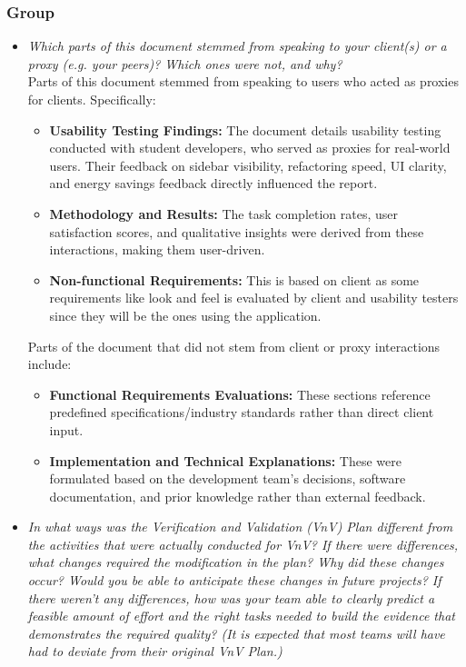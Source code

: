 \documentclass[12pt, titlepage]{article}
\begin{document}
\subsubsection*{Group}
\begin{itemize}
  \item \textit{Which parts of this document stemmed from speaking to
      your client(s) or
    a proxy (e.g. your peers)? Which ones were not, and why?} \\

    Parts of this document stemmed from speaking to users who acted
    as proxies for clients. Specifically:
    \begin{itemize}
      \item \textbf{Usability Testing Findings:} The document details
        usability testing conducted with student developers, who
        served as proxies for real-world users. Their feedback on
        sidebar visibility, refactoring speed, UI clarity, and energy
        savings feedback directly influenced the report.
      \item \textbf{Methodology and Results:} The task completion
        rates, user satisfaction scores, and qualitative insights
        were derived from these interactions, making them user-driven.
      \item \textbf{Non-functional Requirements:} This is based on
        client as some requirements like look and feel is evaluated
        by client and usability testers since they will be the ones
        using the application.
    \end{itemize}

    Parts of the document that did not stem from client or proxy
    interactions include:
    \begin{itemize}

      \item \textbf{Functional Requirements Evaluations:} These
        sections reference predefined specifications/industry
        standards rather than direct client input.
      \item \textbf{Implementation and Technical Explanations:} These
        were formulated based on the development team’s decisions,
        software documentation, and prior knowledge rather than
        external feedback.

    \end{itemize}


  \item \textit{In what ways was the Verification and Validation
      (VnV) Plan different
      from the activities that were actually conducted for VnV?  If there were
      differences, what changes required the modification in the plan?  Why did
      these changes occur?  Would you be able to anticipate these
      changes in future
      projects?  If there weren't any differences, how was your team
      able to clearly
      predict a feasible amount of effort and the right tasks needed
      to build the
      evidence that demonstrates the required quality?  (It is
        expected that most
    teams will have had to deviate from their original VnV Plan.)}\\


\end{itemize}
\end{document}
